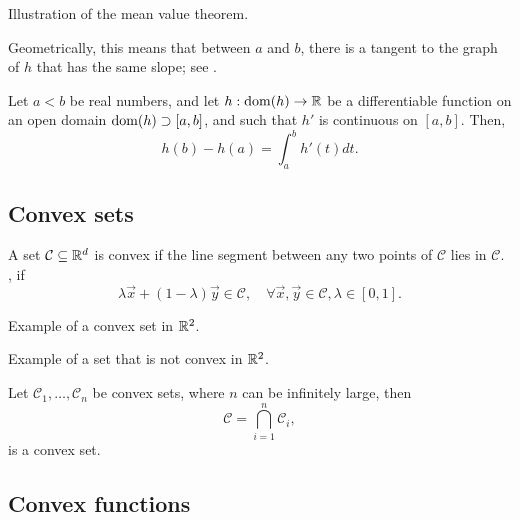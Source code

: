 \begin{marginfigure}
    \centering
    \caption{Illustration of the mean value theorem.}
    \label{fig:mean-value-theorem}
\end{marginfigure}

Geometrically, this means that between $a$ and $b$, there is a tangent to the graph of $h$ that has
the same slope; see .

\begin{theorem}
    Let $a<b$ be real numbers, and let $h: \mathrm{dom}(h) \to \mathbb{R}$ be a differentiable function on an open domain $\mathrm{dom}(h) \supset [a,b]$, and such that $h'$ is continuous on $[a,b]$. Then, \[
        h(b) - h(a) = \int_a^b h'(t)dt.
    \]
\end{theorem}

\subsection{Convex sets}

\begin{definition}
    A set $\mathcal{C}\subseteq \mathbb{R}^d$ is convex if the line segment between any two points of
    $\mathcal{C}$ lies in $\mathcal{C}$. \Ie, if \[
        \lambda \vec{x} + (1-\lambda)\vec{y} \in \mathcal{C}, \quad \forall \vec{x}, \vec{y} \in \mathcal{C}, \lambda \in [0,1].
    \]
\end{definition}

\begin{marginfigure}
    \centering
    \caption{Example of a convex set in $\mathbb{R}^2$.}
    \label{fig:convex-set-example}
\end{marginfigure}

\begin{marginfigure}
    \centering
    \caption{Example of a set that is not convex in $\mathbb{R}^2$.}
    \label{fig:non-convex-set-example}
\end{marginfigure}

\begin{lemma}
    Let $\mathcal{C}_1, \ldots, \mathcal{C}_n$ be convex sets, where $n$ can be infinitely large, then \[
        \mathcal{C} = \bigcap_{i=1}^n \mathcal{C}_i,
    \]
    is a convex set.
\end{lemma}

\subsection{Convex functions}

